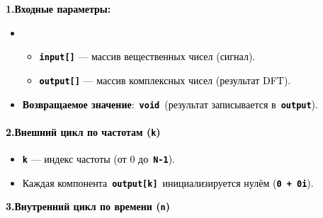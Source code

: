 \documentclass[a4paper]{article}
\newcommand\textstyleStrongEmphasis[1]{\textbf{#1}}
\newcommand\textstyleSourceText[1]{\texttt{#1}}
\newcommand\textstyleBulletSymbols[1]{\textrm{#1}}
\begin{document}
\bigskip

{\bfseries
\textstyleStrongEmphasis{1.\foreignlanguage{russian}{\textcolor{black}{Входные
параметры}}}\foreignlanguage{russian}{\textmd{\textcolor{black}{:}}}}

\begin{itemize}[series=listLiii,label=\textstyleBulletSymbols{•}]
\item \begin{itemize}[series=listLiii,label=\textstyleBulletSymbols{•}]
\item \textstyleSourceText{\textrm{\textbf{\textcolor{black}{input[]}}}}\textcolor{black}{ — массив вещественных чисел
(сигнал).}
\item \textstyleSourceText{\textrm{\textbf{\textcolor{black}{output[]}}}}\textcolor{black}{ — массив комплексных чисел
(результат DFT).}
\end{itemize}
\item \textstyleStrongEmphasis{\textcolor{black}{Возвращаемое
значение}}\textcolor{black}{: }\textstyleSourceText{\textrm{\textbf{\textcolor{black}{void}}}}\textcolor{black}{ (результат
записывается в }\textstyleSourceText{\textrm{\textbf{\textcolor{black}{output}}}}\textcolor{black}{).}
\end{itemize}

\bigskip

\paragraph[2.Внешний цикл по частотам (k)]{\textcolor{black}{2.Внешний цикл по частотам
(}\textstyleSourceText{\textrm{\textcolor{black}{k}}}\textcolor{black}{)}}

\bigskip

\begin{itemize}[series=listLiv,label=\textstyleBulletSymbols{•}]
\item \textstyleStrongEmphasis{\textstyleSourceText{\textrm{\textcolor{black}{k}}}}\textcolor{black}{ — индекс частоты
(от 0 до }\textstyleSourceText{\textrm{\textbf{\textcolor{black}{N-1}}}}\textcolor{black}{).}
\item \textcolor{black}{Каждая
компонента }\textstyleSourceText{\textrm{\textbf{\textcolor{black}{output[k]}}}}\textcolor{black}{ инициализируется
нулём (}\textstyleSourceText{\textrm{\textbf{\textcolor{black}{0 + 0i}}}}\textcolor{black}{).}


\bigskip
\end{itemize}
\textbf{\textcolor{black}{3.Внутренний цикл по времени
(}}\textstyleSourceText{\textrm{\textbf{\textcolor{black}{n}}}}\textbf{\textcolor{black}{)}}
\end{document}
